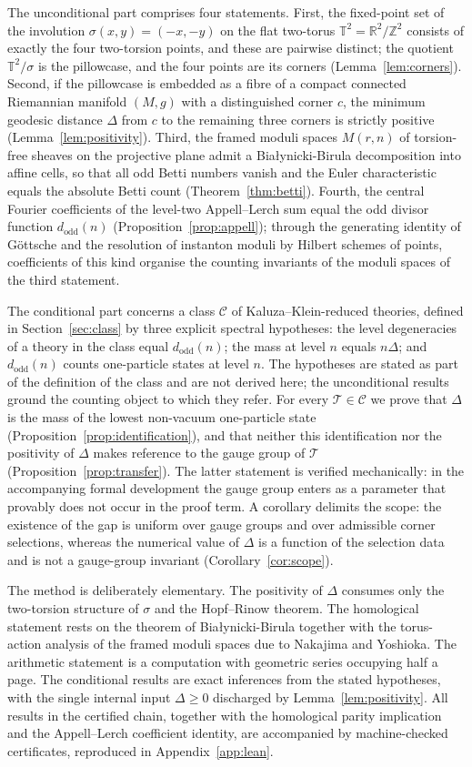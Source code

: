 \documentclass[11pt,a4paper]{article}
\newcommand{\T}{\mathbb{T}}
\newcommand{\R}{\mathbb{R}}
\newcommand{\Z}{\mathbb{Z}}
\newcommand{\dodd}{d_{\mathrm{odd}}}
\newcommand{\class}{\mathcal{C}}
\newcommand{\thy}{\mathcal{T}}
\newcommand{\Mod}{M}
\theoremstyle{plain}
\theoremstyle{definition}
\theoremstyle{remark}
\begin{document}
The unconditional part comprises four statements. First, the
fixed-point set of the involution $\sigma(x,y) = (-x,-y)$ on the flat
two-torus $\T^2 = \R^2/\Z^2$ consists of exactly the four two-torsion
points, and these are pairwise distinct; the quotient $\T^2/\sigma$ is
the pillowcase, and the four points are its corners
(Lemma~\ref{lem:corners}). Second, if the pillowcase is embedded as a
fibre of a compact connected Riemannian manifold $(M,g)$ with a
distinguished corner $c$, the minimum geodesic distance $\Delta$ from
$c$ to the remaining three corners is strictly positive
(Lemma~\ref{lem:positivity}). Third, the framed moduli spaces
$\Mod(r,n)$ of torsion-free sheaves on the projective plane admit a
Bia{\l}ynicki-Birula decomposition into affine cells, so that all odd
Betti numbers vanish and the Euler characteristic equals the absolute
Betti count (Theorem~\ref{thm:betti}). Fourth, the central Fourier
coefficients of the level-two Appell--Lerch sum equal the odd divisor
function $\dodd(n)$ (Proposition~\ref{prop:appell}); through the
generating identity of G\"ottsche and the resolution of instanton
moduli by Hilbert schemes of points, coefficients of this kind
organise the counting invariants of the moduli spaces of the third
statement.

The conditional part concerns a class $\class$ of
Kaluza--Klein-reduced theories, defined in Section~\ref{sec:class} by
three explicit spectral hypotheses: the level degeneracies of a theory
in the class equal $\dodd(n)$; the mass at level $n$ equals $n\Delta$;
and $\dodd(n)$ counts one-particle states at level $n$. The hypotheses
are stated as part of the definition of the class and are not derived
here; the unconditional results ground the counting object to which
they refer. For every $\thy \in \class$ we prove that $\Delta$ is the
mass of the lowest non-vacuum one-particle state
(Proposition~\ref{prop:identification}), and that neither this
identification nor the positivity of $\Delta$ makes reference to the
gauge group of $\thy$ (Proposition~\ref{prop:transfer}). The latter
statement is verified mechanically: in the accompanying formal
development the gauge group enters as a parameter that provably does
not occur in the proof term. A corollary delimits the scope: the
existence of the gap is uniform over gauge groups and over admissible
corner selections, whereas the numerical value of $\Delta$ is a
function of the selection data and is not a gauge-group invariant
(Corollary~\ref{cor:scope}).

The method is deliberately elementary. The positivity of $\Delta$
consumes only the two-torsion structure of $\sigma$ and the
Hopf--Rinow theorem. The homological statement rests on the theorem of
Bia{\l}ynicki-Birula together with the torus-action analysis of the
framed moduli spaces due to Nakajima and Yoshioka. The arithmetic
statement is a computation with geometric series occupying half a
page. The conditional results are exact inferences from the stated
hypotheses, with the single internal input $\Delta \ge 0$ discharged
by Lemma~\ref{lem:positivity}. All results in the certified chain,
together with the homological parity implication and the
Appell--Lerch coefficient identity, are accompanied by machine-checked
certificates, reproduced in Appendix~\ref{app:lean}.
\end{document}
